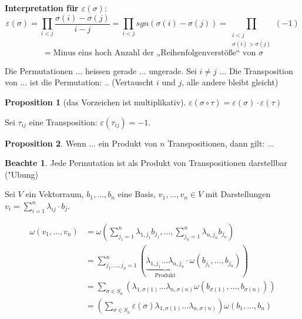 \documentclass[oneside,fontsize=11pt,paper=a4,BCOR=0mm,DIV=12,automark,headsepline]{scrbook}
\theoremstyle{remark}
\theoremstyle{definition}
\newtheorem*{notte}{Beachte}
\newtheorem*{proposition}{Proposition}
\theoremstyle{definition}
\theoremstyle{remark}
\begin{document}
\textbf{Interpretation für \(\varepsilon(\sigma) \)}:
\[\varepsilon(\sigma) = \prod\limits_{i<j}\frac{\sigma(i)-\sigma(j)}{i-j} = \prod_{i<j} sgn(\sigma(i)-\sigma(j)) = \prod_{\substack{i<j\\ \sigma(i)>\sigma(j)}} (-1)\]\[ = \text{Minus eins hoch Anzahl der „Reihenfolgenverstöße“ von }\sigma\]


\begin{definition}{}{}
  Die Permutationen ... heissen gerade ... ungerade.
  Sei $i\not=j$ ... Die Transposition von ... ist die Permutation: ..
  (Vertauscht $i$ und $j$, alle andere bleibt gleicht)
\end{definition}


\begin{proposition}[das Vorzeichen ist multiplikativ]
  $\varepsilon(\sigma\circ \tau)= \varepsilon (\sigma) \cdot \varepsilon (\tau)$
\end{proposition}


\begin{relation}
  Sei $\tau_{ij}$ eine Transposition: $\varepsilon(\tau_{ij})=-1$.
\end{relation}

\begin{proposition}
  Wenn ... ein Produkt von $n$ Transpositionen, dann gilt: ...
\end{proposition}

\begin{notte}
  Jede Permutation ist als Produkt von Transpositionen darstellbar ("Ubung)
\end{notte}


Sei \(V\) ein Vektorraum, \(b_1, ..., b_n\) eine Basis, \(v_1, ..., v_n \in
V\) mit Darstellungen \(v_i = \sum_{i=1}^n{\lambda_{ij}\cdot b_j}\).

\begin{align*}
  \omega(v_1,\dots,v_n) &= \omega\left(\sum_{j_1=1}^n\lambda_{1,j_1}b_{j_1},\dots,\sum_{j_n=1}^n\lambda_{n,j_n}b_{j_n}\right) \\
                        &= \sum_{j_1,\dots,j_n=1}^n\left(\underbrace{\lambda_{1,j_1}\dots\lambda_{n,j_n}}_{\text{Produkt}}\cdot\omega(b_{j_1},\dots,b_{j_n})\right) \\
                        &= \sum_{\sigma\in S_n}\left(\lambda_{1,\sigma(1)}\dots\lambda_{n,\sigma(n)}\omega(b_{\sigma(1)},\dots,b_{\sigma(n)})\right) \\
                        &= \left(\sum_{\sigma\in S_n}{\varepsilon(\sigma)}\lambda_{1,\sigma(1)}\dots\lambda_{n,\sigma(n)}\right)\omega(b_1,\dots,b_n)
\end{align*}
\end{document}
